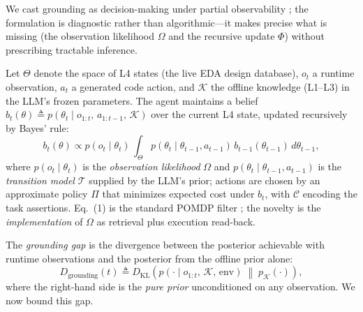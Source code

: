 We cast grounding as decision-making under partial observability \cite{kaelbling1998planning, thrun2005probabilistic}; the formulation is diagnostic rather than algorithmic---it makes precise what is missing (the observation likelihood $\Omega$ and the recursive update $\Phi$) without prescribing tractable inference.

Let $\Theta$ denote the space of L4 states (the live EDA design database), $o_t$ a runtime observation, $a_t$ a generated code action, and $\mathcal{K}$ the offline knowledge (L1--L3) in the LLM's frozen parameters. The agent maintains a belief $b_t(\theta)\triangleq p(\theta_t\mid o_{1:t},\,a_{1:t-1},\,\mathcal{K})$ over the current L4 state, updated recursively by Bayes' rule:
\begin{equation}
b_t(\theta) \propto p(o_t \mid \theta_t)\, \int_{\Theta} p(\theta_t \mid \theta_{t-1}, a_{t-1})\, b_{t-1}(\theta_{t-1})\, d\theta_{t-1},
\end{equation}
where $p(o_t \mid \theta_t)$ is the \emph{observation likelihood} $\Omega$ and $p(\theta_t \mid \theta_{t-1}, a_{t-1})$ is the \emph{transition model} $\mathcal{T}$ supplied by the LLM's prior; actions are chosen by an approximate policy $\Pi$ that minimizes expected cost under $b_t$, with $\mathcal{C}$ encoding the task assertions. Eq.~(1) is the standard POMDP filter \cite{kaelbling1998planning}; the novelty is the \emph{implementation} of $\Omega$ as retrieval plus execution read-back.

The \emph{grounding gap} is the divergence between the posterior achievable with runtime observations and the posterior from the offline prior alone:
\begin{equation}
D_{\text{grounding}}(t) \triangleq D_{\mathrm{KL}}\!\left(p(\cdot \mid o_{1:t},\, \mathcal{K},\, \text{env}) \;\middle\|\; p_{\mathcal{K}}(\cdot)\right),
\end{equation}
where the right-hand side is the \emph{pure prior} unconditioned on any observation. We now bound this gap.

